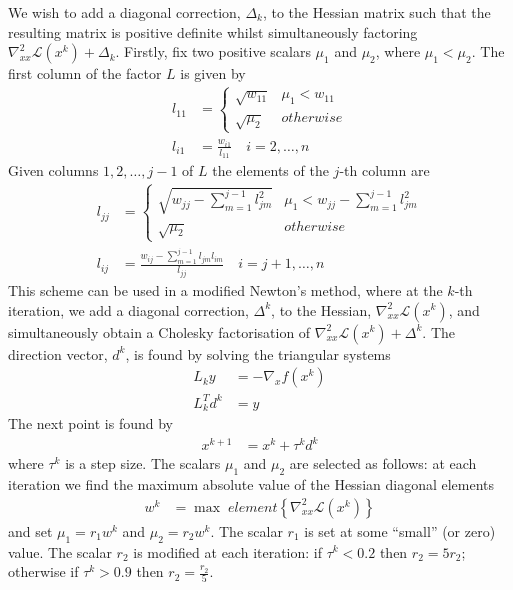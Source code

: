 \documentclass[a4paper,twoside,10pt,english]{report}
\begin{document}
We wish to add a diagonal correction, $\Delta_{k}$, to the Hessian
matrix such that the resulting matrix is positive definite whilst
simultaneously factoring $\nabla_{xx}^{2}\mathcal{L}\left(x^{k}\right)+\Delta_{k}$.
Firstly, fix two positive scalars $\mu_{1}$ and $\mu_{2}$, where
$\mu_{1}<\mu_{2}$. The first column of the factor $L$ is given by
\begin{align*}
l_{11} &= \begin{cases}
\sqrt{w_{11}} & \mu_{1}<w_{11}\\
\sqrt{\mu_{2}} & otherwise
\end{cases}\\
l_{i1} &= \frac{w_{i1}}{l_{11}}\quad i=2,\ldots,n
\end{align*}
Given columns $1,2,\ldots,j-1$ of $L$ the elements of the $j$-th
column are
\begin{align*}
l_{jj} &= \begin{cases}
\sqrt{w_{jj}-\sum_{m=1}^{j-1}l_{jm}^{2}} & \mu_{1}<w_{jj}-\sum_{m=1}^{j-1}l_{jm}^{2}\\
\sqrt{\mu_{2}} & otherwise
\end{cases}\\
l_{ij} &= \frac{w_{ij}-\sum_{m=1}^{j-1}l_{jm}l_{im}}{l_{jj}}\quad i=j+1,\dots,n
\end{align*}
This scheme can be used in a modified Newton's method, where at the
$k$-th iteration, we add a diagonal correction, $\Delta^{k}$, to the
Hessian, $\nabla_{xx}^{2}\mathcal{L}\left(x^{k}\right)$, and simultaneously
obtain a Cholesky factorisation of $\nabla_{xx}^{2}\mathcal{L}\left(x^{k}\right)+\Delta^{k}$.
The direction vector, $d^{k}$, is found by solving the triangular systems
\begin{align*}
L_{k}y &= -\nabla_{x}f\left(x^{k}\right)\\
L_{k}^{T}d^{k} &= y
\end{align*}
The next point is found by 
\begin{align*}
x^{k+1} &= x^{k}+\tau^{k}d^{k}
\end{align*}
where $\tau^{k}$ is a step size. The scalars $\mu_{1}$ and $\mu_{2}$
are selected as follows: at each iteration we find the maximum absolute
value of the Hessian diagonal elements
\begin{align*}
w^{k}&=\max\; element\left\{ \nabla_{xx}^{2}\mathcal{L}\left(x^{k}\right)\right\} 
\end{align*}
and set $\mu_{1}=r_{1}w^{k}$ and $\mu_{2}=r_{2}w^{k}$. The scalar
$r_{1}$ is set at some ``small'' (or zero) value. The scalar $r_{2}$
is modified at each iteration: if $\tau^{k}<0.2$ then $r_{2}=5r_{2}$;
otherwise if $\tau^{k}>0.9$ then $r_{2}=\frac{r_{2}}{5}$.
\end{document}
